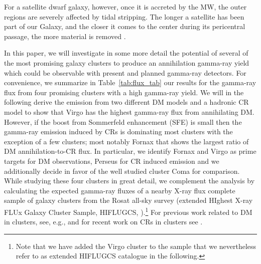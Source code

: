 \documentclass[10pt,aps,pra,reprint,amsmath,amsfonts,amssymb,showpacs,nofootinbib,floatfix]{revtex4-1}
\begin{document}
For a satellite dwarf galaxy, however, once it is accreted by the MW,
the outer regions are severely affected by tidal stripping. The longer
a satellite has been part of our Galaxy, and the closer it comes to
the center during its pericentral passage, the more material is
removed \cite{2004MNRAS.355..819G}.

In this paper, we will investigate in some more detail the potential
of several of the most promising galaxy clusters to produce an
annihilation gamma-ray yield which could be observable with present
and planned gamma-ray detectors. For convenience, we summarize in
Table~\ref{tab:flux_tab} our results for the gamma-ray flux from four
promising clusters with a high gamma-ray yield. We will in the
following derive the emission from two different DM models and a
hadronic CR model to show that Virgo has the highest gamma-ray flux
from annihilating DM. However, if the boost from Sommerfeld
enhancement (SFE) is small then the gamma-ray emission induced by CRs
is dominating most clusters with the exception of a few clusters; most
notably Fornax that shows the largest ratio of DM annihilation-to-CR
flux. In particular, we identify Fornax and Virgo as prime targets for
DM observations, Perseus for CR induced emission and we additionally
decide in favor of the well studied cluster Coma for comparison. While
studying these four clusters in great detail, we complement the
analysis by calculating the expected gamma-ray fluxes of a nearby
X-ray flux complete sample of galaxy clusters from the Rosat all-sky
survey (extended HIghest X-ray FLUx Galaxy Cluster Sample, HIFLUGCS,
\cite{2002ApJ...567..716R,2007A&A...466..805C}).\footnote{Note that
  we have added the Virgo cluster to the sample that we nevertheless
  refer to as extended HIFLUGCS catalogue in the following.} For
previous work related to DM in clusters, see, e.g.,
\cite{2006A&A...455...21C,2009PhRvD..80b3005J,2011arXiv1104.3530S,2011ApJ...726L...6C,2010JCAP...05..025A}
and for recent work on CRs in clusters see
\cite{2010MNRAS.409..449P,2011MNRAS.410..127B,2008MNRAS.385.1211P,2009JCAP...08..002K,2010MNRAS.407.1565D}.
\end{document}
